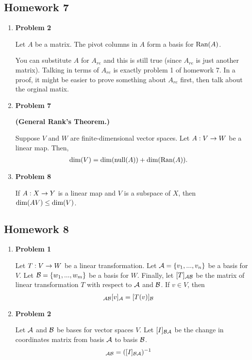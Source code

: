 \subsection{Homework 7}
\begin{enumerate}
    \item[] \textbf{Problem 2}
    \begin{lemma}
        Let $A$ be a matrix. The pivot columns in $A$ form a basis for $\text{Ran}(A)$.
    \end{lemma}
    \begin{remark}
        You can substitute $A$ for $A_{re}$ and this is still true (since $A_{re}$ is just another matrix). Talking in terms of $A_{re}$ is exactly
        problem 1 of homework 7. In a proof, it might be easier to prove something about $A_{re}$ first, then talk about the orginal matix.
    \end{remark}
    \item[] \textbf{Problem 7}
    \begin{thm} \textbf{(General Rank's Theorem.)}

        Suppose $V$ and $W$ are finite-dimensional vector spaces. Let $A : V \rightarrow W$ be a linear map. Then,
        \begin{align*}
            \text{dim}(V) &= \dim (\text{null}(A)) + \dim (\text{Ran}(A)).
        \end{align*}
    \end{thm}
    \item[] \textbf{Problem 8}
    \begin{lemma}
        If $A : X \rightarrow Y$ is a linear map and $V$ is a subspace of $X$, then $\dim (AV) \leq \text{dim}(V)$.
    \end{lemma}
\end{enumerate}

\subsection{Homework 8}
\begin{enumerate}
    \item[] \textbf{Problem 1}
    \begin{lemma}
        Let $T: V \rightarrow W$ be a linear transformation. Let $\mathcal{A} = \{v_1, ..., v_n\}$ be a basis for $V$. Let $\mathcal{B} = \{ w_1, ..., w_m \}$ be a basis for
        $W$. Finally, let $[T]_{\mathcal{A} \mathcal{B}}$ be the matrix of linear transformation $T$ with respect to $\mathcal{A}$ and $\mathcal{B}$.
        If $v \in V$, then 
        \begin{align*}
            [T]_{\cA \cB} [v]_{\cA} &= [T(v)]_{\cB}
        \end{align*}
    \end{lemma}
    \item[] \textbf{Problem 2}
    \begin{lemma}
        Let $\mathcal{A}$ and $\mathcal{B}$ be bases for vector spaces $V$. Let $[I]_{\mathcal{B} \mathcal{A}}$ be the change in coordinates matrix from basis $\mathcal{A}$ to basis $\mathcal{B}$.
        \begin{align*}
            [I]_{\cA \cB} &= ([I]_{\cB \cA})^{-1}
        \end{align*}
    \end{lemma}
\end{enumerate}

